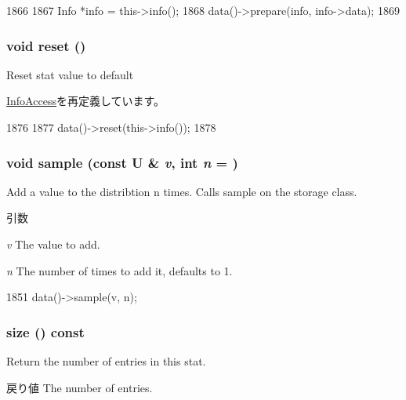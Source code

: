 \begin{DoxyCode}
1866     {
1867         Info *info = this->info();
1868         data()->prepare(info, info->data);
1869     }
\end{DoxyCode}
\hypertarget{classStats_1_1DistBase_ad20897c5c8bd47f5d4005989bead0e55}{
\subsubsection[{reset}]{\setlength{\rightskip}{0pt plus 5cm}void reset ()}}
\label{classStats_1_1DistBase_ad20897c5c8bd47f5d4005989bead0e55}
Reset stat value to default 

\hyperlink{classStats_1_1InfoAccess_ad20897c5c8bd47f5d4005989bead0e55}{InfoAccess}を再定義しています。


\begin{DoxyCode}
1876     {
1877         data()->reset(this->info());
1878     }
\end{DoxyCode}
\hypertarget{classStats_1_1DistBase_afed4e1e09f566c5aa9e972d8c17b5a27}{
\subsubsection[{sample}]{\setlength{\rightskip}{0pt plus 5cm}void sample (const U \& {\em v}, \/  int {\em n} = {})}}
\label{classStats_1_1DistBase_afed4e1e09f566c5aa9e972d8c17b5a27}
Add a value to the distribtion n times. Calls sample on the storage class. 
\begin{DoxyParams}{引数}
\item[{\em v}]The value to add. \item[{\em n}]The number of times to add it, defaults to 1. \end{DoxyParams}



\begin{DoxyCode}
1851 { data()->sample(v, n); }
\end{DoxyCode}
\hypertarget{classStats_1_1DistBase_a503ab01f6c0142145d3434f6924714e7}{
\subsubsection[{size}]{ size () const}}
\label{classStats_1_1DistBase_a503ab01f6c0142145d3434f6924714e7}
Return the number of entries in this stat. \begin{DoxyReturn}{戻り値}
The number of entries. 
\end{DoxyReturn}



